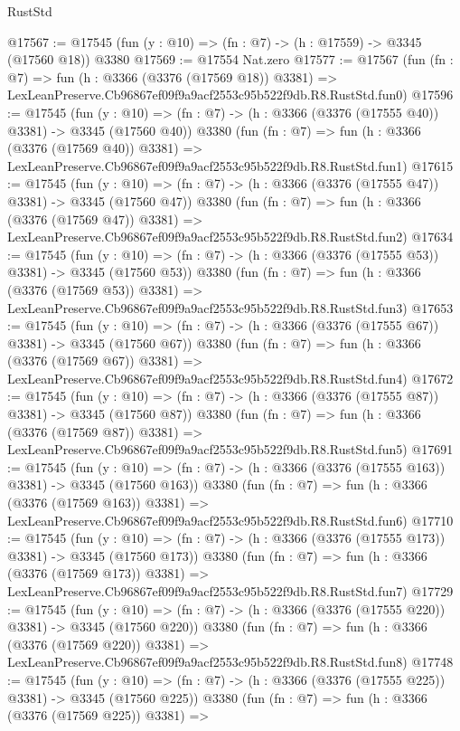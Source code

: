 \begin{lexlean}{RustStd}
\begin{coremodule}
@17567 := @17545 (fun (y : @10) => (fn : @7) -> (h : @17559) -> @3345 (@17560 @18)) @3380
@17569 := @17554 Nat.zero
@17577 := @17567
    (fun (fn : @7) =>
    fun (h : @3366 (@3376 (@17569 @18)) @3381) =>
    LexLeanPreserve.Cb96867ef09f9a9acf2553c95b522f9db.R8.RustStd.fun0)
@17596 := @17545
    (fun (y : @10) => (fn : @7) -> (h : @3366 (@3376 (@17555 @40)) @3381) -> @3345 (@17560 @40))
    @3380
    (fun (fn : @7) =>
    fun (h : @3366 (@3376 (@17569 @40)) @3381) =>
    LexLeanPreserve.Cb96867ef09f9a9acf2553c95b522f9db.R8.RustStd.fun1)
@17615 := @17545
    (fun (y : @10) => (fn : @7) -> (h : @3366 (@3376 (@17555 @47)) @3381) -> @3345 (@17560 @47))
    @3380
    (fun (fn : @7) =>
    fun (h : @3366 (@3376 (@17569 @47)) @3381) =>
    LexLeanPreserve.Cb96867ef09f9a9acf2553c95b522f9db.R8.RustStd.fun2)
@17634 := @17545
    (fun (y : @10) => (fn : @7) -> (h : @3366 (@3376 (@17555 @53)) @3381) -> @3345 (@17560 @53))
    @3380
    (fun (fn : @7) =>
    fun (h : @3366 (@3376 (@17569 @53)) @3381) =>
    LexLeanPreserve.Cb96867ef09f9a9acf2553c95b522f9db.R8.RustStd.fun3)
@17653 := @17545
    (fun (y : @10) => (fn : @7) -> (h : @3366 (@3376 (@17555 @67)) @3381) -> @3345 (@17560 @67))
    @3380
    (fun (fn : @7) =>
    fun (h : @3366 (@3376 (@17569 @67)) @3381) =>
    LexLeanPreserve.Cb96867ef09f9a9acf2553c95b522f9db.R8.RustStd.fun4)
@17672 := @17545
    (fun (y : @10) => (fn : @7) -> (h : @3366 (@3376 (@17555 @87)) @3381) -> @3345 (@17560 @87))
    @3380
    (fun (fn : @7) =>
    fun (h : @3366 (@3376 (@17569 @87)) @3381) =>
    LexLeanPreserve.Cb96867ef09f9a9acf2553c95b522f9db.R8.RustStd.fun5)
@17691 := @17545
    (fun (y : @10) => (fn : @7) -> (h : @3366 (@3376 (@17555 @163)) @3381) -> @3345 (@17560 @163))
    @3380
    (fun (fn : @7) =>
    fun (h : @3366 (@3376 (@17569 @163)) @3381) =>
    LexLeanPreserve.Cb96867ef09f9a9acf2553c95b522f9db.R8.RustStd.fun6)
@17710 := @17545
    (fun (y : @10) => (fn : @7) -> (h : @3366 (@3376 (@17555 @173)) @3381) -> @3345 (@17560 @173))
    @3380
    (fun (fn : @7) =>
    fun (h : @3366 (@3376 (@17569 @173)) @3381) =>
    LexLeanPreserve.Cb96867ef09f9a9acf2553c95b522f9db.R8.RustStd.fun7)
@17729 := @17545
    (fun (y : @10) => (fn : @7) -> (h : @3366 (@3376 (@17555 @220)) @3381) -> @3345 (@17560 @220))
    @3380
    (fun (fn : @7) =>
    fun (h : @3366 (@3376 (@17569 @220)) @3381) =>
    LexLeanPreserve.Cb96867ef09f9a9acf2553c95b522f9db.R8.RustStd.fun8)
@17748 := @17545
    (fun (y : @10) => (fn : @7) -> (h : @3366 (@3376 (@17555 @225)) @3381) -> @3345 (@17560 @225))
    @3380
    (fun (fn : @7) =>
    fun (h : @3366 (@3376 (@17569 @225)) @3381) =>

\end{coremodule}
\end{lexlean}
